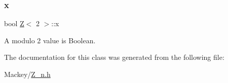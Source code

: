 \subsubsection{\texorpdfstring{x}{x}}
{\footnotesize\ttfamily bool \hyperlink{classZ}{Z}$<$ 2 $>$\+::x}



A modulo 2 value is Boolean. 



The documentation for this class was generated from the following file\+:\begin{DoxyCompactItemize}
\item 
Mackey/\hyperlink{Z__n_8h}{Z\+\_\+n.\+h}\end{DoxyCompactItemize}
